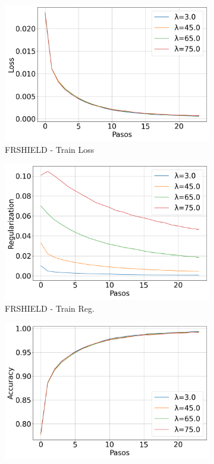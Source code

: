 \begin{figure}[H]
    \centering
    \begin{subfigure}[b]{0.3\textwidth}
        \includegraphics[width=\linewidth]{images/Train_Loss_evolucion_frshield.png}
        \caption{FRSHIELD - Train Loss}
    \end{subfigure}
    \hfill
    \begin{subfigure}[b]{0.3\textwidth}
        \includegraphics[width=\linewidth]{images/Train_Regularization_evolucion_frshield.png}
        \caption{FRSHIELD - Train Reg.}
    \end{subfigure}
    \hfill
    \begin{subfigure}[b]{0.3\textwidth}
        \includegraphics[width=\linewidth]{images/Train_Accuracy_evolucion_frshield.png}

\end{subfigure}
\end{figure}
